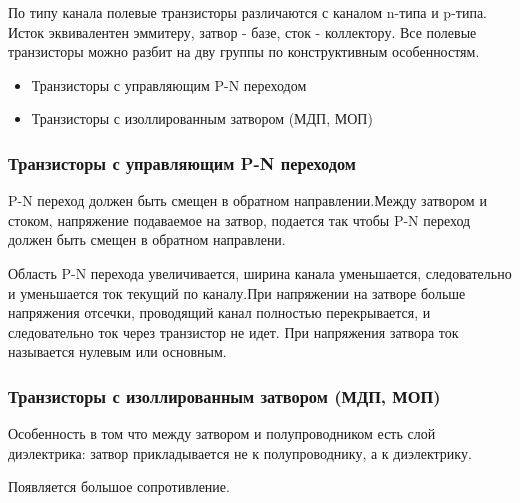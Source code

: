 \documentclass[../main.tex]{subfiles}
\begin{document}
По типу канала полевые транзисторы различаются с каналом n-типа и p-типа.
Исток эквивалентен эммитеру, затвор - базе, сток - коллектору. Все полевые транзисторы можно разбит на дву группы по конструктивным особенностям.
\begin{itemize}
    \item Транзисторы с управляющим P-N переходом
    \item Транзисторы с изоллированным затвором (МДП, МОП)
\end{itemize}

\subsubsection{Транзисторы с управляющим P-N переходом}
P-N переход должен быть смещен в обратном направлении.Между затвором и стоком, напряжение подаваемое на затвор, подается так чтобы P-N переход должен быть смещен в обратном направлени.

Область P-N перехода увеличивается, ширина канала уменьшается, следовательно и уменьшается ток текущий по каналу.При напряжении на затворе больше напряжения отсечки,
проводящий канал полностью перекрывается, и следовательно ток через транзистор не идет. При напряжения затвора ток называется нулевым или основным.

\subsubsection{Транзисторы с изоллированным затвором (МДП, МОП)}
Особенность в том что между затвором и полупроводником есть слой диэлектрика: затвор прикладывается не к полупроводнику, а к диэлектрику.

Появляется большое сопротивление.
\end{document}
